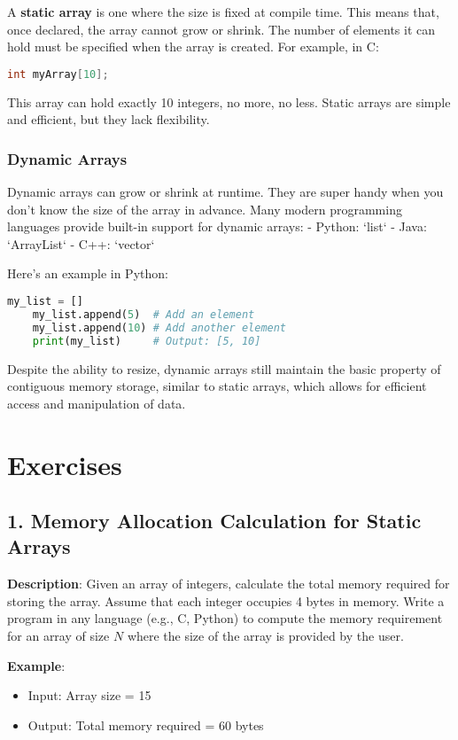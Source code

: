 \documentclass[12pt, oneside]{book}
\begin{document}
A \textbf{static array} is one where the size is fixed at compile time. This means that, once declared, the array cannot grow or shrink. The number of elements it can hold must be specified when the array is created.
For example, in C:
\begin{lstlisting}[language=C]
	int myArray[10];
\end{lstlisting}
This array can hold exactly 10 integers, no more, no less. Static arrays are simple and efficient, but they lack flexibility.

\subsubsection{Dynamic Arrays}
Dynamic arrays can grow or shrink at runtime. They are super handy when you don’t know the size of the array in advance. Many modern programming languages provide built-in support for dynamic arrays:  
- Python: `list`  
- Java: `ArrayList`  
- C++: `vector`  

Here’s an example in Python:
\begin{lstlisting}[language=Python]
	my_list = []
	my_list.append(5)  # Add an element
	my_list.append(10) # Add another element
	print(my_list)     # Output: [5, 10]
\end{lstlisting}
Despite the ability to resize, dynamic arrays still maintain the basic property of contiguous memory storage, similar to static arrays, which allows for efficient access and manipulation of data.
\section{Exercises}
\subsection*{1. Memory Allocation Calculation for Static Arrays}
\textbf{Description}: Given an array of integers, calculate the total memory required for storing the array. Assume that each integer occupies 4 bytes in memory. Write a program in any language (e.g., C, Python) to compute the memory requirement for an array of size \( N \) where the size of the array is provided by the user.

\textbf{Example}:
\begin{itemize}
	\item Input: Array size = 15
	\item Output: Total memory required = 60 bytes
\end{itemize}
\end{document}
